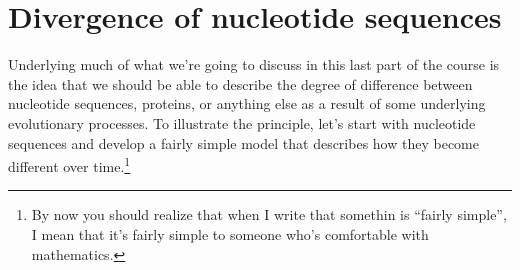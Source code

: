 \section*{Divergence of nucleotide sequences}

Underlying much of what we're going to discuss in this last part of
the course is the idea that we should be able to describe the degree
of difference between nucleotide sequences, proteins, or anything else
as a result of some underlying evolutionary processes. To illustrate
the principle, let's start with nucleotide sequences and develop a
fairly simple model that describes how they become different over
time.\footnote{By now you should realize that when I write that
  somethin is ``fairly simple'', I mean that it's fairly simple to
  someone who's comfortable with mathematics.}

